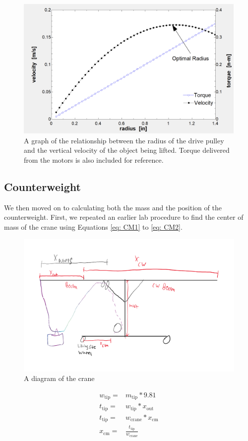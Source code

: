 \documentclass[letterpaper, 12pt]{article}
\begin{document}
\begin{figure}[H]
    \centering
    \includegraphics[width =.45\linewidth]{Torque_Speed.png}
    \caption{A graph of the relationship between the radius of the drive pulley and the vertical velocity of the object being lifted. Torque delivered from the motors is also included for reference.}
    \label{fig:Torque_Speed}
\end{figure}

\subsection{Counterweight}
We then moved on to calculating both the mass and the position of the counterweight. 
First, we repeated an earlier lab procedure to find the center of mass of the crane using Equations \ref{eq: CM1} to \ref{eq: CM2}.
\begin{figure}[H]
    \centering
    \includegraphics[width =0.6\linewidth]{null (3).png}
    \caption{A diagram of the crane}
    \label{fig:CraneDiagram}
\end{figure}

\begin{align}
        w_{\text{tip}}= & m_{\text{tip}} * 9.81 \label{eq: CM1} \\ 
        t_{\text{tip}}= & w_{\text{tip}}*x_{\text{out}}\label{eq:Torque 1} \\ 
        t_{\text{tip}}= & w_{\text{crane}}*x_{\text{cm}}\label{eq:Torque 2} \\
        x_{\text{cm}}= & \frac{t_{\text{tip}}}{w_{\text{crane}}} \label{eq: CM2}
\end{align}
\end{document}
